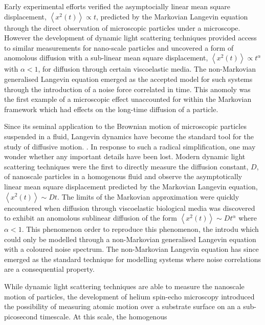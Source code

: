 \documentclass[7pt]{article}
\begin{document}
Early experimental efforts verified the asymptocially linear mean square displacement, $\left<x^2(t)\right> \propto t$, predicted by the Markovian Langevin equation through the direct observation of microscopic particles under a microscope. However the development of dynamic light scattering techniques provided access to similar measurements for nano-scale particles and uncovered a form of anomolous diffusion with a sub-linear mean square displacement, $\left<x^2(t)\right> \propto t^\alpha$ with $\alpha < 1$, for diffusion through certain viscoelastic media. The non-Markovian generalised Langevin equation\cite{Kubo} emerged as the accepted model for such systems through the introduction of a noise force correlated in time. This anomoly was the first example of a microscopic effect unaccounted for within the Markovian framework which had effects on the long-time diffusion of a particle. 

Since its seminal application to the Brownian motion\cite{Lemons1997} of microscopic particles suspended in a fluid, Langevin dynamics have become the standard tool for the study of diffusive motion. . In response to such a radical simplification, one may wonder whether any important details have been lost. Modern dynamic light scattering techniques\cite{Pecora} were the first to directly measure the diffusion constant, $D$, of nanoscale particles in a homogenous fluid\cite{FOORD1970, Pecora2000} and observe the asymptotically linear mean square displacement predicted by the Markovian Langevin equation\cite{Zwanzig}, $\left<x^2(t)\right> \sim Dt$. The limits of the Markovian approximation were quickly encountered when diffusion through viscoelastic biological media was discovered to exhibit an anomolous sublinear diffusion of the form $\left<x^2(t)\right> \sim Dt^\alpha$ where $\alpha < 1$. This phenomenon order to reproduce this phenomenon, the introdu which could only be modelled through a non-Markovian generalised Langevin equation with a coloured noise spectrum\cite{Mason, Hfling2013, McKinley2018}. The non-Markovian Langevin equation has since emerged as the standard technique for modelling systems where noise correlations are a consequential property\cite{GlattHoltz2020, Kubo}.

While dynamic light scattering techniques are able to measure the nanoscale motion of particles, the development of helium spin-echo microscopy\cite{DeKieviet1995, DEKIEVIET1997} introduced the possibility of measuring atomic motion over a substrate surface on an a sub-picosecond timescale. At this scale, the homogenous
\end{document}

